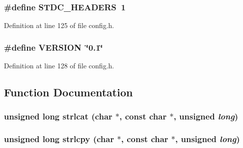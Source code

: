 \subsubsection{\setlength{\rightskip}{0pt plus 5cm}\#define STDC\_\-HEADERS\ 1}\label{config_8h_a33}




Definition at line 125 of file config.h.
\subsubsection{\setlength{\rightskip}{0pt plus 5cm}\#define VERSION\ \char`\"{}0.1\char`\"{}}\label{config_8h_a34}




Definition at line 128 of file config.h.

\subsection{Function Documentation}
\subsubsection{\setlength{\rightskip}{0pt plus 5cm}unsigned long strlcat (char $\ast$, const char $\ast$, unsigned {\em long})}\label{config_8h_a36}


\subsubsection{\setlength{\rightskip}{0pt plus 5cm}unsigned long strlcpy (char $\ast$, const char $\ast$, unsigned {\em long})}\label{config_8h_a37}


